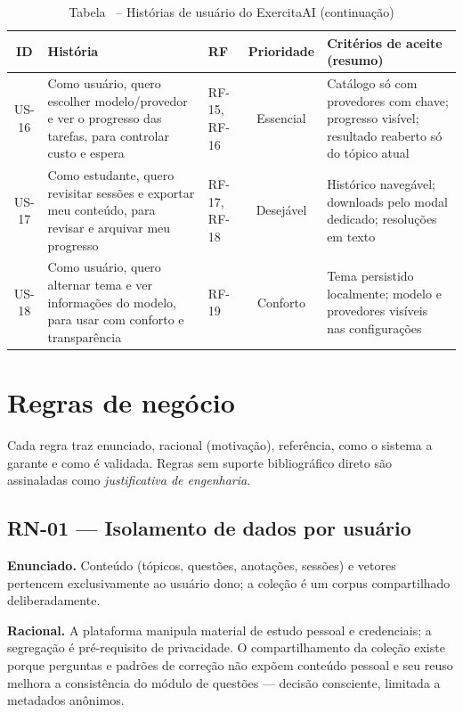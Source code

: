 \begin{table}[H]
\centering
\setlength{\tabcolsep}{2.5pt}
\caption*{Tabela \thetable\ -- Histórias de usuário do ExercitaAI (continuação)}
\begin{tabularx}{\textwidth}{|C|Y|L{1.5cm}|C|Y|}
\hline
\textbf{ID} & \textbf{História} & \textbf{RF} & \textbf{Prioridade} & \textbf{Critérios de aceite (resumo)} \\
\hline
US-16 & Como usuário, quero escolher modelo/provedor e ver o progresso das tarefas, para controlar custo e espera & RF-15, RF-16 & Essencial & Catálogo só com provedores com chave; progresso visível; resultado reaberto só do tópico atual \\
\hline
US-17 & Como estudante, quero revisitar sessões e exportar meu conteúdo, para revisar e arquivar meu progresso & RF-17, RF-18 & Desejável & Histórico navegável; downloads pelo modal dedicado; resoluções em texto \\
\hline
US-18 & Como usuário, quero alternar tema e ver informações do modelo, para usar com conforto e transparência & RF-19 & Conforto & Tema persistido localmente; modelo e provedores visíveis nas configurações \\
\hline
\end{tabularx}
\end{table}

\section{Regras de negócio}
\label{ap:req-regras}

Cada regra traz enunciado, racional (motivação), referência, como o sistema a garante e como é validada. Regras sem suporte bibliográfico direto são assinaladas como \emph{justificativa de engenharia}.

\subsection{RN-01 --- Isolamento de dados por usuário}

\textbf{Enunciado.} Conteúdo (tópicos, questões, anotações, sessões) e vetores pertencem exclusivamente ao usuário dono; a coleção \texttt{} é um corpus compartilhado deliberadamente.

\textbf{Racional.} A plataforma manipula material de estudo pessoal e credenciais; a segregação é pré-requisito de privacidade. O compartilhamento da coleção \texttt{} existe porque perguntas e padrões de correção não expõem conteúdo pessoal e seu reuso melhora a consistência do módulo de questões --- decisão consciente, limitada a metadados anônimos.

